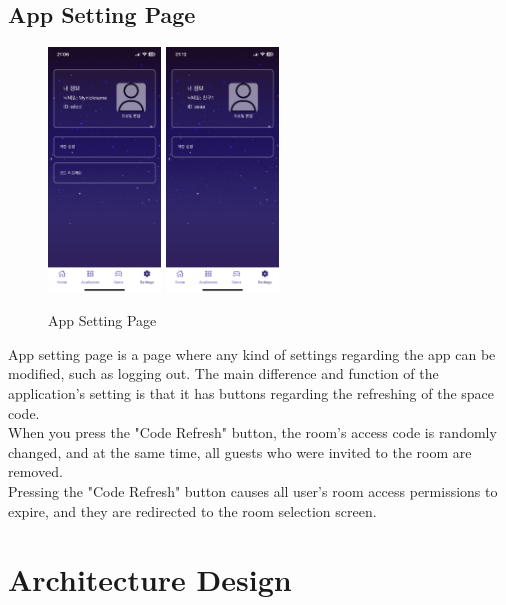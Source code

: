 \documentclass[conference]{IEEEtran}
\begin{document}
    \subsection{App Setting Page}
        \begin{figure}[htbp]
            \centerline{\includegraphics[width=3cm]{Images/screen/settings/SETTING_HOST.PNG}
            \includegraphics[width=3cm]{Images/screen/settings/SETTING_GUEST.PNG}}
            \caption{App Setting Page}
            \label{fig}
        \end{figure}
        App setting page is a page where any kind of settings regarding the app can be modified, such as logging out. The main difference and function of the application’s setting is that it has buttons regarding the refreshing of the space code.\\
        When you press the "Code Refresh" button, the room's access code is randomly changed, and at the same time, all guests who were invited to the room are removed.\\
        Pressing the "Code Refresh" button causes all user's room access permissions to expire, and they are redirected to the room selection screen.

\section{Architecture Design}
\end{document}
